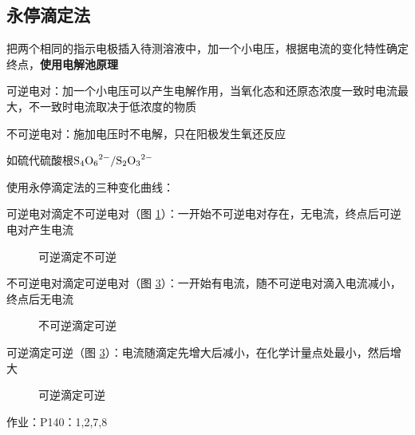 \subsection{永停滴定法}%
\label{sub:永停滴定法}
把两个相同的指示电极插入待测溶液中，加一个小电压，根据电流的变化特性确定终点，\textbf{使用电解池原理}
\begin{notation}
    可逆电对：加一个小电压可以产生电解作用，当氧化态和还原态浓度一致时电流最大，不一致时电流取决于低浓度的物质
\end{notation}
\begin{notation}
    不可逆电对：施加电压时不电解，只在阳极发生氧还反应

    如硫代硫酸根$\ce{S_4O_{6}^{2-}}/\ce{S_2O_3^{2-}}$
\end{notation}
使用永停滴定法的三种变化曲线：
\begin{notation}
    可逆电对滴定不可逆电对（图 \ref{fig:可逆滴定不可逆}）：一开始不可逆电对存在，无电流，终点后可逆电对产生电流
\begin{figure}[ht!]
    \centering
    \caption{可逆滴定不可逆}
    \label{fig:可逆滴定不可逆}
\end{figure}
\end{notation}
\begin{notation}
    不可逆电对滴定可逆电对（图 \ref{fig:可逆滴定可逆}）：一开始有电流，随不可逆电对滴入电流减小，终点后无电流
\begin{figure}[ht!]
    \centering
    \caption{不可逆滴定可逆}
    \label{fig:不可逆滴定可逆}
\end{figure}
\end{notation}
\begin{notation}
    可逆滴定可逆（图 \ref{fig:可逆滴定可逆}）：电流随滴定先增大后减小，在化学计量点处最小，然后增大
\begin{figure}[ht!]
    \centering
    \caption{可逆滴定可逆}
    \label{fig:可逆滴定可逆}
\end{figure}
\end{notation}
作业：P140：1,2,7,8
